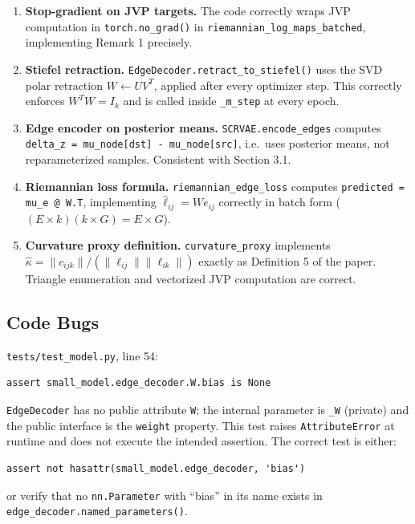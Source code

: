 \documentclass[11pt]{article}
\begin{document}
\begin{enumerate}
\item \textbf{Stop-gradient on JVP targets.} The code correctly wraps JVP
computation in \texttt{torch.no\_grad()} in \texttt{riemannian\_log\_maps\_batched},
implementing Remark 1 precisely.

\item \textbf{Stiefel retraction.} \texttt{EdgeDecoder.retract\_to\_stiefel()} uses
the SVD polar retraction $W \leftarrow UV^T$, applied after every optimizer step.
This correctly enforces $W^TW = I_k$ and is called inside \texttt{\_m\_step}
at every epoch.

\item \textbf{Edge encoder on posterior means.} \texttt{SCRVAE.encode\_edges}
computes \texttt{delta\_z = mu\_node[dst] - mu\_node[src]}, i.e.\ uses posterior
means, not reparameterized samples. Consistent with Section 3.1.

\item \textbf{Riemannian loss formula.} \texttt{riemannian\_edge\_loss} computes
\texttt{predicted = mu\_e @ W.T}, implementing $\hat\ell_{ij} = W e_{ij}$
correctly in batch form ($(E\times k)(k\times G) = E\times G$).

\item \textbf{Curvature proxy definition.} \texttt{curvature\_proxy} implements
$\hat\kappa = \|c_{ijk}\|/(\|\ell_{ij}\|\|\ell_{ik}\|)$ exactly as
Definition 5 of the paper. Triangle enumeration and vectorized JVP computation
are correct.
\end{enumerate}

\subsection{Code Bugs}

\begin{bugbox}
\texttt{tests/test\_model.py}, line 54:
\begin{verbatim}
assert small_model.edge_decoder.W.bias is None
\end{verbatim}
\texttt{EdgeDecoder} has no public attribute \texttt{W}; the internal parameter
is \texttt{\_W} (private) and the public interface is the \texttt{weight}
property. This test raises \texttt{AttributeError} at runtime and does not
execute the intended assertion. The correct test is either:
\begin{verbatim}
assert not hasattr(small_model.edge_decoder, 'bias')
\end{verbatim}
or verify that no \texttt{nn.Parameter} with ``bias'' in its name exists in
\texttt{edge\_decoder.named\_parameters()}.
\end{bugbox}
\end{document}

